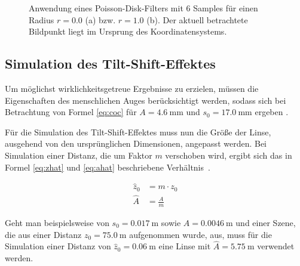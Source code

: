\documentclass{acmsiggraph}                     %
\begin{document}
\begin{figure}[htbp]
\centering
{}
\qquad
{}
\caption{Anwendung eines Poisson-Disk-Filters mit 6 Samples für einen Radius $r = 0.0$ (a) bzw. $r = 1.0$ (b). Der aktuell betrachtete Bildpunkt liegt im Ursprung des Koordinatensystems.}
\label{fig:poisson}
\end{figure}

\subsection{Simulation des Tilt-Shift-Effektes}
\label{sec:tilt}

Um möglichst wirklichkeitsgetreue Ergebnisse zu erzielen, müssen die Eigenschaften des menschlichen Auges berücksichtigt werden, sodass sich bei Betrachtung von Formel \ref{eq:coc} für $A = \SI{4.6}{\milli\meter}$ und $s_0 = \SI{17.0}{\milli\meter}$ ergeben \cite{Held:2010cr}. 

Für die Simulation des Tilt-Shift-Effektes muss nun die Größe der Linse, ausgehend von den ursprünglichen Dimensionen, angepasst werden. Bei Simulation einer Distanz, die um Faktor $m$ verschoben wird, ergibt sich das in Formel \ref{eq:zhat} und \ref{eq:ahat} beschriebene Verhältnis~\cite{Held:2010cr}.

\begin{align}
	 \label{eq:zhat}
	\hat z_0 &= m \cdot  z_0 \\
	 \label{eq:ahat}
	\hat A &= \frac{A}{m}
\end{align}

Geht man beispielsweise von $s_0 = \SI{0.017}{\meter}$ sowie $A = \SI{0.0046}{\meter}$ und einer Szene, die aus einer Distanz $z_0 = \SI{75.0}{\meter}$ aufgenommen wurde, aus, muss für die Simulation einer Distanz von $\hat z_0 = \SI{0.06}{\meter}$ eine Linse mit $\hat A = \SI{5.75}{\meter}$ verwendet werden.
\end{document}

